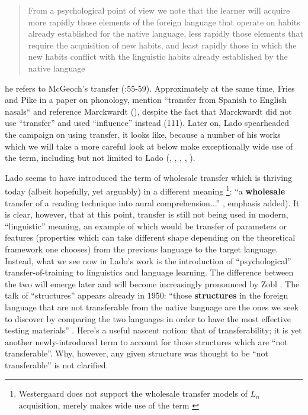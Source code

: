 \documentclass{article}
\begin{document}
\begin{quote}
    From a psychological point of view we note that the learner will acquire more rapidly those elements of the foreign language that operate on habits already established for the native language, less rapidly those elements that require the acquisition of new habits, and least rapidly those in which the new habits conflict with the linguistic habits already established by the native language \citep[][p. 109]{lado_relation_1949}
\end{quote}

he refers to McGeoch’s transfer (\citeyear{mcgeoch_psychology_1942}:55-59). Approximately at the same time, Fries and Pike in a paper on phonology, mention ``transfer from Spanish to English nasals`` \citep[][p. 37]{fries_coexistent_1949} and reference Marckwardt (\citeyear{marckwardt_phonemic_1946}), despite the fact that Marckwardt did not use ``transfer'' and used ``influence'' instead (111). Later on, Lado spearheaded the campaign on using transfer, it looks like, because a number of his works which we will take a more careful look at below make exceptionally wide use of the term, including but not limited to Lado (\citeyear{lado_survey_1950}, \citeyear{lado_testing_1951}, \citeyear{lado_comparison_1956}, \citeyear{lado_linguistics_1957}, \citeyear{lado_sentence_1957}). 

Lado seems to have introduced the term of wholesale transfer which is thriving today (albeit hopefully, yet arguably) in a different meaning \citep[cf.][]{schwartz_full_2021, westergaard_microvariation_2021}\footnote{Westergaard does not support the wholesale transfer models of \(L_n\) acquisition, merely makes wide use of the term \citep[][pp. 2, 12f, 15, etc.]{westergaard_microvariation_2021}}: ``a \textbf{wholesale} transfer of a reading technique into aural comprehension...'' \citep[][p. 53]{lado_testing_1951}, emphasis added). It is clear, however, that at this point, transfer is still not being used in modern, ``linguistic'' meaning, an example of which would be transfer of parameters or features (properties which can take different shape depending on the theoretical framework one chooses) from the previous language to the target language. Instead, what we see now in Lado's work is the introduction of ``psychological'' transfer-of-training to linguistics and language learning. The difference between the two will emerge later and will become increasingly pronounced by Zobl \cite{zobl_developmental_1980}. The talk of ``structures'' appears already in 1950: ``those \textbf{structures} in the foreign language that are not transferable from the native language are the ones we seek to discover by comparing the two languages in order to have the most effective testing materials'' \citep[][p. 19, emphasis added]{lado_testing_1951}. Here’s a useful nascent notion: that of transferability; it is yet another newly-introduced term to account for those structures which are ``not transferable''. Why, however, any given structure was thought to be ``not transferable'' is not clarified.
\end{document}
